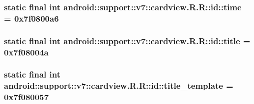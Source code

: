 \hypertarget{classandroid_1_1support_1_1v7_1_1cardview_1_1_r_1_1id_82a02bed40ec6040ba9e69be3187086f}{
\subsubsection[{time}]{\setlength{\rightskip}{0pt plus 5cm}static final int android::support::v7::cardview.R.R::id::time = 0x7f0800a6}}
\label{classandroid_1_1support_1_1v7_1_1cardview_1_1_r_1_1id_82a02bed40ec6040ba9e69be3187086f}


\hypertarget{classandroid_1_1support_1_1v7_1_1cardview_1_1_r_1_1id_aa85420bbca31795935008f8223f50c9}{
\subsubsection[{title}]{\setlength{\rightskip}{0pt plus 5cm}static final int android::support::v7::cardview.R.R::id::title = 0x7f08004a}}
\label{classandroid_1_1support_1_1v7_1_1cardview_1_1_r_1_1id_aa85420bbca31795935008f8223f50c9}


\hypertarget{classandroid_1_1support_1_1v7_1_1cardview_1_1_r_1_1id_ea88edabbbcc745f8bf943ed1f4366cf}{
\subsubsection[{title\_\-template}]{\setlength{\rightskip}{0pt plus 5cm}static final int android::support::v7::cardview.R.R::id::title\_\-template = 0x7f080057}}
\label{classandroid_1_1support_1_1v7_1_1cardview_1_1_r_1_1id_ea88edabbbcc745f8bf943ed1f4366cf}


